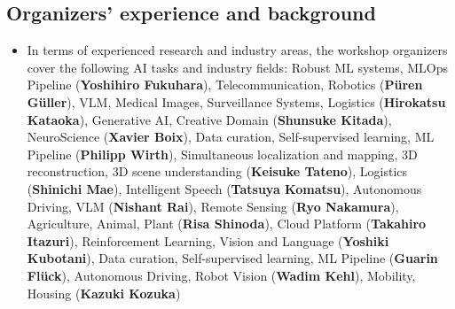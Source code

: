 \documentclass{article}
\def\c#1{\textcolor{gray}{#1}}
\begin{document}
\subsection{Organizers' experience and background}
\begin{itemize}
    \item In terms of experienced research and industry areas, the workshop organizers cover the following AI tasks and industry fields:     Robust ML systems, MLOps Pipeline (\textbf{Yoshihiro Fukuhara}), Telecommunication, Robotics (\textbf{Püren Güller}), VLM, Medical Images, Surveillance Systems, Logistics (\textbf{Hirokatsu Kataoka}), Generative AI, Creative Domain (\textbf{Shunsuke Kitada}), NeuroScience (\textbf{Xavier Boix}), Data curation, Self-supervised learning, ML Pipeline (\textbf{Philipp Wirth}), Simultaneous localization and mapping, 3D reconstruction, 3D scene understanding (\textbf{Keisuke Tateno}), Logistics (\textbf{Shinichi Mae}), Intelligent Speech (\textbf{Tatsuya Komatsu}), Autonomous Driving, VLM (\textbf{Nishant Rai}), Remote Sensing (\textbf{Ryo Nakamura}), Agriculture, Animal, Plant (\textbf{Risa Shinoda}), Cloud Platform (\textbf{Takahiro Itazuri}), Reinforcement Learning, Vision and Language (\textbf{Yoshiki Kubotani}), Data curation, Self-supervised learning, ML Pipeline (\textbf{Guarin Flück}), Autonomous Driving, Robot Vision (\textbf{Wadim Kehl}), Mobility, Housing (\textbf{Kazuki Kozuka})



\end{itemize}
\end{document}
